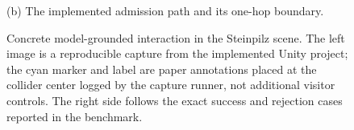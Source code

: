 \begin{figure}[t]
\begin{minipage}[t]{.43\textwidth}
    \centering\footnotesize
    (b) The implemented admission path and its one-hop boundary.
  \end{minipage}
  \caption{Concrete model-grounded interaction in the Steinpilz scene. The
  left image is a reproducible capture from the implemented Unity project; the
  cyan marker and label are paper annotations placed at the collider center
  logged by the capture runner, not additional visitor controls. The right
  side follows the exact success and rejection cases reported in the benchmark.}
  \label{fig:unity-walkthrough}
\end{figure}
